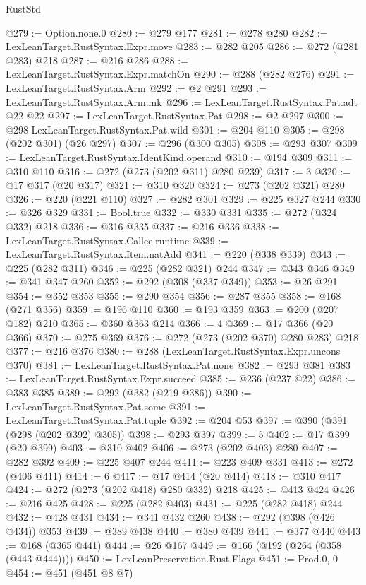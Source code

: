 \begin{lexlean}{RustStd}
\begin{coremodule}
@279 := Option.none.{0}
@280 := @279 @177
@281 := @278 @280
@282 := LexLeanTarget.RustSyntax.Expr.move
@283 := @282 @205
@286 := @272 (@281 @283) @218
@287 := @216 @286
@288 := LexLeanTarget.RustSyntax.Expr.matchOn
@290 := @288 (@282 @276)
@291 := LexLeanTarget.RustSyntax.Arm
@292 := @2 @291
@293 := LexLeanTarget.RustSyntax.Arm.mk
@296 := LexLeanTarget.RustSyntax.Pat.adt @22 @22
@297 := LexLeanTarget.RustSyntax.Pat
@298 := @2 @297
@300 := @298 LexLeanTarget.RustSyntax.Pat.wild
@301 := @204 @110
@305 := @298 (@202 @301) (@26 @297)
@307 := @296 (@300 @305)
@308 := @293 @307
@309 := LexLeanTarget.RustSyntax.IdentKind.operand
@310 := @194 @309
@311 := @310 @110
@316 := @272 (@273 (@202 @311) @280 @239)
@317 := 3
@320 := @17 @317 (@20 @317)
@321 := @310 @320
@324 := @273 (@202 @321) @280
@326 := @220 (@221 @110)
@327 := @282 @301
@329 := @225 @327 @244
@330 := @326 @329
@331 := Bool.true
@332 := @330 @331
@335 := @272 (@324 @332) @218
@336 := @316 @335
@337 := @216 @336
@338 := LexLeanTarget.RustSyntax.Callee.runtime
@339 := LexLeanTarget.RustSyntax.Item.natAdd
@341 := @220 (@338 @339)
@343 := @225 (@282 @311)
@346 := @225 (@282 @321) @244
@347 := @343 @346
@349 := @341 @347 @260
@352 := @292 (@308 (@337 @349))
@353 := @26 @291
@354 := @352 @353
@355 := @290 @354
@356 := @287 @355
@358 := @168 (@271 @356)
@359 := @196 @110
@360 := @193 @359
@363 := @200 (@207 @182) @210
@365 := @360 @363 @214
@366 := 4
@369 := @17 @366 (@20 @366)
@370 := @275 @369
@376 := @272 (@273 (@202 @370) @280 @283) @218
@377 := @216 @376
@380 := @288 (LexLeanTarget.RustSyntax.Expr.uncons @370)
@381 := LexLeanTarget.RustSyntax.Pat.none
@382 := @293 @381
@383 := LexLeanTarget.RustSyntax.Expr.succeed
@385 := @236 (@237 @22)
@386 := @383 @385
@389 := @292 (@382 (@219 @386))
@390 := LexLeanTarget.RustSyntax.Pat.some
@391 := LexLeanTarget.RustSyntax.Pat.tuple
@392 := @204 @53
@397 := @390 (@391 (@298 (@202 @392) @305))
@398 := @293 @397
@399 := 5
@402 := @17 @399 (@20 @399)
@403 := @310 @402
@406 := @273 (@202 @403) @280
@407 := @282 @392
@409 := @225 @407 @244
@411 := @223 @409 @331
@413 := @272 (@406 @411)
@414 := 6
@417 := @17 @414 (@20 @414)
@418 := @310 @417
@424 := @272 (@273 (@202 @418) @280 @332) @218
@425 := @413 @424
@426 := @216 @425
@428 := @225 (@282 @403)
@431 := @225 (@282 @418) @244
@432 := @428 @431
@434 := @341 @432 @260
@438 := @292 (@398 (@426 @434)) @353
@439 := @389 @438
@440 := @380 @439
@441 := @377 @440
@443 := @168 (@365 @441)
@444 := @26 @167
@449 := @166 (@192 (@264 (@358 (@443 @444))))
@450 := LexLeanPreservation.Rust.Flags
@451 := Prod.{0, 0}
@454 := @451 (@451 @8 @7)

\end{coremodule}
\end{lexlean}
